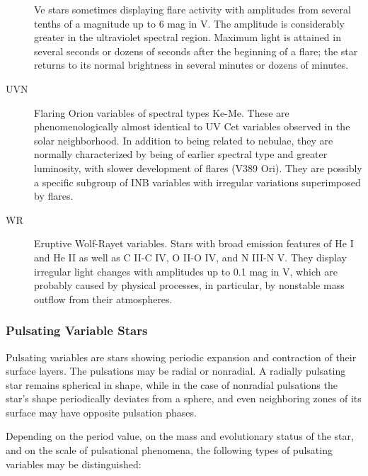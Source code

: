 \begin{description}
				Ve stars sometimes displaying flare activity with amplitudes from
				several tenths of a magnitude up to 6 mag in V. The amplitude is
				considerably greater in the ultraviolet spectral region. Maximum light
				is attained in several seconds or dozens of seconds after the beginning
				of a flare; the star returns to its normal brightness in several minutes
				or dozens of minutes.
\item[UVN]		Flaring Orion variables of spectral types Ke-Me. These
				are phenomenologically almost identical to UV Cet variables observed in
				the solar neighborhood. In addition to being related to nebulae, they
				are normally characterized by being of earlier spectral type and greater
				luminosity, with slower development of flares (V389 Ori). They are
				possibly a specific subgroup of INB variables with irregular variations
				superimposed by flares.
\item[WR]		Eruptive Wolf-Rayet variables. Stars with broad emission
				features of He I and He II as well as C II-C IV, O II-O IV, and N III-N
				V. They display irregular light changes with amplitudes up to 0.1 mag in
				V, which are probably caused by physical processes, in particular, by
				nonstable mass outflow from their atmospheres.
\end{description}

\subsubsection{Pulsating Variable Stars}\label{pulsating-variable-stars}

Pulsating variables are stars showing periodic expansion and contraction
of their surface layers. The pulsations may be radial or nonradial. A
radially pulsating star remains spherical in shape, while in the case of
nonradial pulsations the star's shape periodically deviates from a
sphere, and even neighboring zones of its surface may have opposite
pulsation phases.

Depending on the period value, on the mass and evolutionary status of
the star, and on the scale of pulsational phenomena, the following types
of pulsating variables may be distinguished:

